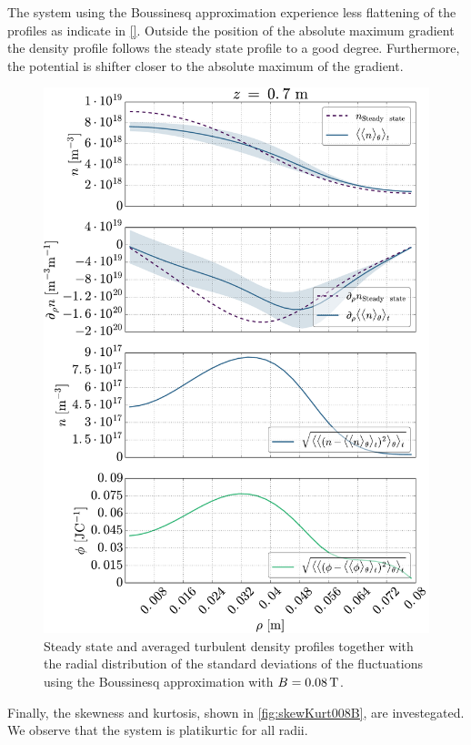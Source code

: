 The system using the Boussinesq approximation experience less flattening of the profiles as indicate in \cref{}.
Outside the position of the absolute maximum gradient the density profile follows the steady state profile to a good degree.
Furthermore, the potential is shifter closer to the absolute maximum of the gradient.
%
\begin{figure}[htb]
    \centering
    \includegraphics[width=1.0\textwidth]{fig/results/compareBouss/fluctProfiles008B}
    \caption{Steady state and averaged turbulent density profiles together with the radial distribution of the standard deviations of the fluctuations using the Boussinesq approximation with $B=0.08\, \text{T}$.}
    \label{fig:posOfFluct008B}
\end{figure}
%
Finally, the skewness and kurtosis, shown in \cref{fig:skewKurt008B}, are investegated.
We observe that the system is platikurtic for all radii.

